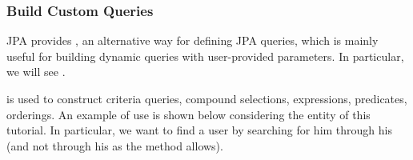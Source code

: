 







\subsubsection{Build Custom Queries}

JPA provides , an alternative way for defining JPA
queries, which is mainly useful for building dynamic queries with user-provided
parameters. In particular, we will see .

 is used to construct criteria queries, compound
selections, expressions, predicates, orderings. An example of use is shown
below considering the  entity of this tutorial. In particular, we
want to find a user by searching for him through his  (and not
through his  as the  method allows).


